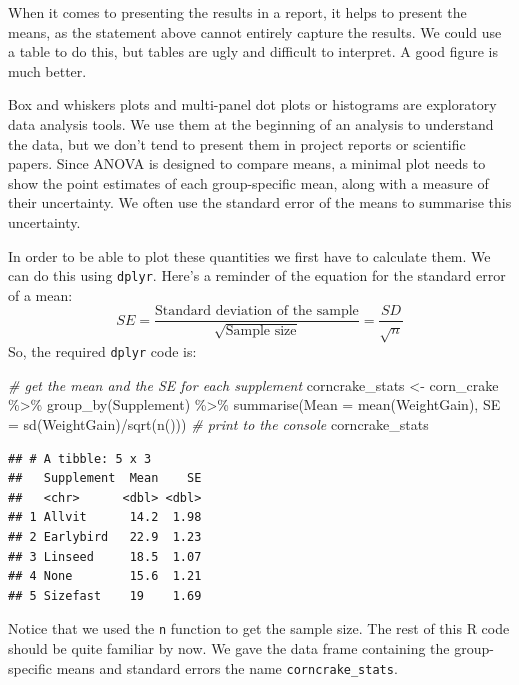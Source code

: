 \documentclass[
]{book}
\newenvironment{Shaded}{\begin{snugshade}}{\end{snugshade}}
\newcommand{\AttributeTok}[1]{\textcolor[rgb]{0.77,0.63,0.00}{#1}}
\newcommand{\CommentTok}[1]{\textcolor[rgb]{0.56,0.35,0.01}{\textit{#1}}}
\newcommand{\FunctionTok}[1]{\textcolor[rgb]{0.00,0.00,0.00}{#1}}
\newcommand{\NormalTok}[1]{#1}
\newcommand{\OtherTok}[1]{\textcolor[rgb]{0.56,0.35,0.01}{#1}}
\newcommand{\SpecialCharTok}[1]{\textcolor[rgb]{0.00,0.00,0.00}{#1}}
\begin{document}
When it comes to presenting the results in a report, it helps to present the means, as the statement above cannot entirely capture the results. We could use a table to do this, but tables are ugly and difficult to interpret. A good figure is much better.

Box and whiskers plots and multi-panel dot plots or histograms are exploratory data analysis tools. We use them at the beginning of an analysis to understand the data, but we don't tend to present them in project reports or scientific papers. Since ANOVA is designed to compare means, a minimal plot needs to show the point estimates of each group-specific mean, along with a measure of their uncertainty. We often use the standard error of the means to summarise this uncertainty.

In order to be able to plot these quantities we first have to calculate them. We can do this using \texttt{dplyr}. Here's a reminder of the equation for the standard error of a mean: \[
SE = \frac{\text{Standard deviation of the sample}}{\sqrt{\text{Sample size}}} = \frac{SD}{\sqrt{n}}
\] So, the required \texttt{dplyr} code is:

\begin{Shaded}
\begin{Highlighting}[]
\CommentTok{\# get the mean and the SE for each supplement}
\NormalTok{corncrake\_stats }\OtherTok{\textless{}{-}} 
\NormalTok{  corn\_crake }\SpecialCharTok{\%\textgreater{}\%} 
  \FunctionTok{group\_by}\NormalTok{(Supplement) }\SpecialCharTok{\%\textgreater{}\%} 
  \FunctionTok{summarise}\NormalTok{(}\AttributeTok{Mean =} \FunctionTok{mean}\NormalTok{(WeightGain), }\AttributeTok{SE =} \FunctionTok{sd}\NormalTok{(WeightGain)}\SpecialCharTok{/}\FunctionTok{sqrt}\NormalTok{(}\FunctionTok{n}\NormalTok{()))}
\CommentTok{\# print to the console}
\NormalTok{corncrake\_stats}
\end{Highlighting}
\end{Shaded}

\begin{verbatim}
## # A tibble: 5 x 3
##   Supplement  Mean    SE
##   <chr>      <dbl> <dbl>
## 1 Allvit      14.2  1.98
## 2 Earlybird   22.9  1.23
## 3 Linseed     18.5  1.07
## 4 None        15.6  1.21
## 5 Sizefast    19    1.69
\end{verbatim}

Notice that we used the \texttt{n} function to get the sample size. The rest of this R code should be quite familiar by now. We gave the data frame containing the group-specific means and standard errors the name \texttt{corncrake\_stats}.
\end{document}
